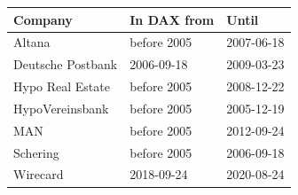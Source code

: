 \begin{tabular}{lll}
\toprule
Company & In DAX from & Until \\
\midrule
Altana & before 2005 & 2007-06-18 \\
Deutsche Postbank & 2006-09-18 & 2009-03-23 \\
Hypo Real Estate & before 2005 & 2008-12-22 \\
HypoVereinsbank & before 2005 & 2005-12-19 \\
MAN & before 2005 & 2012-09-24 \\
Schering & before 2005 & 2006-09-18 \\
Wirecard & 2018-09-24 & 2020-08-24 \\
\bottomrule
\end{tabular}
